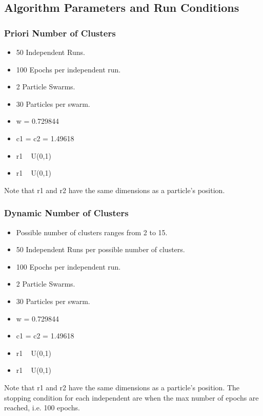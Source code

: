 \begin{flushleft}
    \subsection{Algorithm Parameters and Run Conditions}
        \subsubsection{Priori Number of Clusters}
            \begin{itemize}
                \item 50 Independent Runs.
                \item 100 Epochs per independent run.
                \item 2 Particle Swarms.
                \item 30 Particles per swarm.
                \item w = 0.729844
                \item c1 = c2 = 1.49618
                \item r1 ~ U(0,1)
                \item r1 ~ U(0,1)
            \end{itemize}
            Note that r1 and r2 have the same dimensions as a particle's position.
        \subsubsection{Dynamic Number of Clusters}
            \begin{itemize}
                \item Possible number of clusters ranges from 2 to 15.
                \item 50 Independent Runs per possible number of clusters.
                \item 100 Epochs per independent run.
                \item 2 Particle Swarms.
                \item 30 Particles per swarm.
                \item w = 0.729844
                \item c1 = c2 = 1.49618
                \item r1 ~ U(0,1)
                \item r1 ~ U(0,1)
            \end{itemize}
            Note that r1 and r2 have the same dimensions as a particle's position.
            The stopping condition for each independent are when the max number of epochs are reached, i.e. 100 epochs.


\end{flushleft}
